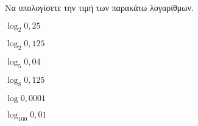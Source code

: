 Να υπολογίσετε την τιμή των παρακάτω λογαρίθμων.
\begin{multicols}{3}
\begin{rlist}[leftmargin=2mm]
\item $ \log_{2}{0{,}25} $
\item $ \log_{2}{0{,}125} $
\item $ \log_{5}{0{,}04} $
\item $ \log_{8}{0{,}125} $
\item $ \log{0{,}0001} $
\item $ \log_{100}{0{,}01} $
\end{rlist}
\end{multicols}
